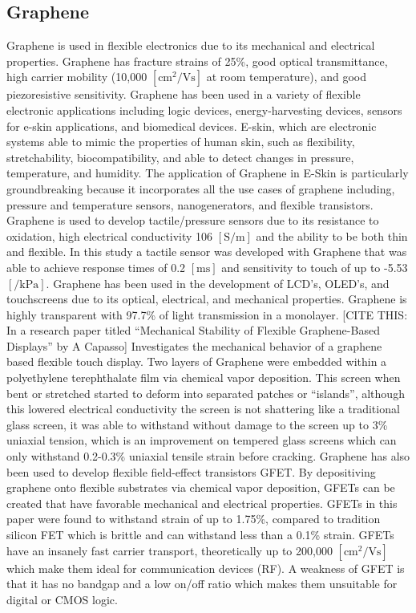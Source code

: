 \documentclass[conference]{IEEEtran}
\begin{document}
\subsection{Graphene}

Graphene is used in flexible electronics due to its mechanical and electrical properties. Graphene has fracture strains of 25\%, good optical transmittance, high carrier mobility (10,000 $[\si{\centi\meter\squared\per\volt\second}]$ at room temperature), and good piezoresistive sensitivity. Graphene has been used in a variety of flexible electronic applications including logic devices, energy-harvesting devices, sensors for e-skin applications, and biomedical devices. E-skin, which are electronic systems able to mimic the properties of human skin, such as flexibility, stretchability, biocompatibility, and able to detect changes in pressure, temperature, and humidity. The application of Graphene in E-Skin is particularly groundbreaking because it incorporates all the use cases of graphene including, pressure and temperature sensors, nanogenerators, and flexible transistors. Graphene is used to develop tactile/pressure sensors due to its resistance to oxidation, high electrical conductivity 106 $[\si{\siemens\per\meter}]$ and the ability to be both thin and flexible. In this study a tactile sensor was developed with Graphene that was able to achieve response times of 0.2 $[\si{\milli\second}]$ and sensitivity to touch of up to -5.53 $[\si{\per\kilo\pascal}]$. Graphene has been used in the development of LCD’s, OLED’s, and touchscreens due to its optical, electrical, and mechanical properties. Graphene is highly transparent  with 97.7\% of light transmission in a monolayer. [CITE THIS: In a research paper titled ``Mechanical Stability of Flexible Graphene-Based Displays'' by A Capasso] Investigates the mechanical behavior of a graphene based flexible touch display. Two layers of Graphene were embedded within a polyethylene terephthalate film via chemical vapor deposition. This screen when bent or stretched started to deform into separated patches or ``islands'', although this lowered electrical conductivity the screen is not shattering like a traditional glass screen, it was able to withstand without damage to the screen up to 3\% uniaxial tension, which is an improvement on tempered glass screens which can only withstand 0.2-0.3\% uniaxial tensile strain before cracking. Graphene has also been used to develop flexible field-effect transistors GFET. By depositiving graphene onto flexible substrates via chemical vapor deposition, GFETs can be created that have favorable mechanical and electrical properties. GFETs in this paper were found to withstand strain of up to 1.75\%, compared to tradition silicon FET which is brittle and can withstand less than a 0.1\% strain. GFETs have an insanely fast carrier transport, theoretically up to 200,000 $[\si{\centi\meter\squared\per\volt\second}]$ which make them ideal for communication devices (RF). A weakness of GFET is that it has no bandgap and a low on/off ratio which makes them unsuitable for digital or CMOS logic.
\end{document}
